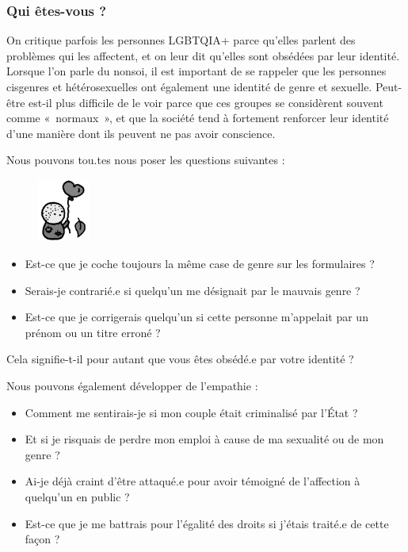 \documentclass[12pt,openany]{book}
\begin{document}
\subsubsection*{Qui êtes-vous ?}

\noindent On critique parfois les personnes \mbox{LGBTQIA+} parce qu’elles parlent des problèmes qui les affectent, et on leur dit qu’elles sont obsédées par leur identité. Lorsque l’on parle du nonsoi, il est important de se rappeler que les personnes cisgenres et hétérosexuelles ont également une identité de genre et sexuelle. Peut-être est-il plus difficile de le voir parce que ces groupes se considèrent souvent comme \mbox{« normaux »}, et que la société tend à fortement renforcer leur identité d’une manière dont ils peuvent ne pas avoir conscience.

Nous pouvons tou.tes nous poser les questions suivantes :
\begin{figure}
    \centering
    \includegraphics[width=0.15\textwidth]{33bw.png}
\end{figure}
\begin{itemize}[label=\textbullet, leftmargin=*]
\setlength\itemsep{-0.3em}
\item Est-ce que je coche toujours la même case de genre sur les formulaires ?
\item Serais-je contrarié.e si quelqu’un me désignait par le mauvais genre ?
\item Est-ce que je corrigerais quelqu’un si cette personne m’appelait par un prénom ou un titre erroné ?
\end{itemize}

Cela signifie-t-il pour autant que vous êtes obsédé.e par votre identité ?

Nous pouvons également développer de l’empathie :

\begin{itemize}[label=\textbullet, leftmargin=*]
\setlength\itemsep{-0.3em}
\item Comment me sentirais-je si mon couple était criminalisé par l’État ?
\item Et si je risquais de perdre mon emploi à cause de ma sexualité ou de mon genre ?
\item Ai-je déjà craint d’être attaqué.e pour avoir témoigné de l’affection à quelqu’un en public ?
\item Est-ce que je me battrais pour l’égalité des droits si j’étais traité.e de cette façon ?
\end{itemize}
\end{document}
